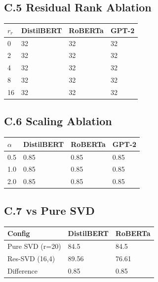 \subsection{C.5 Residual Rank Ablation}

\begin{table}[H]
\centering
\small
\begin{tabular}{llll}
\toprule
\textbf{$r_r$} & \textbf{DistilBERT} & \textbf{RoBERTa} & \textbf{GPT-2} \\
\midrule
0 & 32 & 32 & 32 \\
2 & 32 & 32 & 32 \\
4 & 32 & 32 & 32 \\
8 & 32 & 32 & 32 \\
16 & 32 & 32 & 32 \\
\bottomrule
\end{tabular}
\end{table}

\subsection{C.6 Scaling Ablation}

\begin{table}[H]
\centering
\small
\begin{tabular}{llll}
\toprule
\textbf{$\alpha$} & \textbf{DistilBERT} & \textbf{RoBERTa} & \textbf{GPT-2} \\
\midrule
0.5 & 0.85 & 0.85 & 0.85 \\
1.0 & 0.85 & 0.85 & 0.85 \\
2.0 & 0.85 & 0.85 & 0.85 \\
\bottomrule
\end{tabular}
\end{table}

\subsection{C.7 vs Pure SVD}

\begin{table}[H]
\centering
\small
\begin{tabular}{lll}
\toprule
\textbf{Config} & \textbf{DistilBERT} & \textbf{RoBERTa} \\
\midrule
Pure SVD (r=20) & 84.5 & 84.5 \\
Res-SVD (16,4) & 89.56 & 76.61 \\
Difference & 0.85 & 0.85 \\
\bottomrule
\end{tabular}
\end{table}

